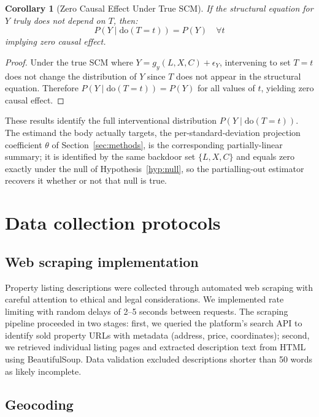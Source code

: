 \documentclass{article}
\newtheorem{corollary}{Corollary}
\begin{document}
\begin{corollary}[Zero Causal Effect Under True SCM]
If the structural equation for $Y$ truly does not depend on $T$, then:
\begin{equation}
P(Y \mid \text{do}(T=t)) = P(Y) \quad \forall t
\end{equation}
implying zero causal effect.
\end{corollary}

\begin{proof}
Under the true SCM where $Y = g_y(L, X, C) + \epsilon_Y$, intervening to set $T=t$ does not change the distribution of $Y$ since $T$ does not appear in the structural equation. Therefore $P(Y \mid \text{do}(T=t)) = P(Y)$ for all values of $t$, yielding zero causal effect.
\end{proof}

These results identify the full interventional distribution $P(Y \mid \mathrm{do}(T=t))$. The estimand the body actually targets, the per-standard-deviation projection coefficient $\theta$ of Section~\ref{sec:methods}, is the corresponding partially-linear summary; it is identified by the same backdoor set $\{L, X, C\}$ and equals zero exactly under the null of Hypothesis~\ref{hyp:null}, so the partialling-out estimator recovers it whether or not that null is true.

\section{Data collection protocols}
\label{app:data_collection}

\subsection{Web scraping implementation}

Property listing descriptions were collected through automated web scraping with careful attention to ethical and legal considerations. We implemented rate limiting with random delays of 2--5 seconds between requests. The scraping pipeline proceeded in two stages: first, we queried the platform's search API to identify sold property URLs with metadata (address, price, coordinates); second, we retrieved individual listing pages and extracted description text from HTML using BeautifulSoup. Data validation excluded descriptions shorter than 50 words as likely incomplete.

\subsection{Geocoding}
\end{document}
